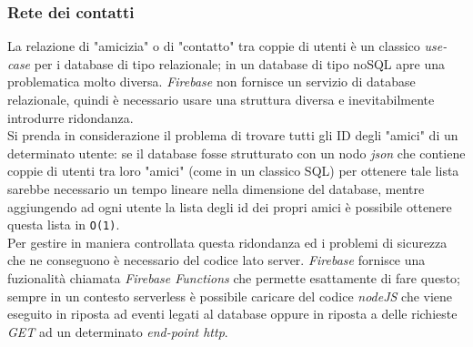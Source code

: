 \documentclass[conference]{IEEEtran}
\begin{document}
		\subsubsection{Rete dei contatti}
			La relazione di "amicizia" o di "contatto" tra coppie di utenti è un classico \textit{use-case} per i database di tipo
			relazionale; in un database di tipo noSQL apre una problematica molto diversa. \textit{Firebase} non fornisce
			un servizio di database relazionale, quindi è necessario usare una struttura diversa e inevitabilmente introdurre
			ridondanza.\\
			Si prenda in considerazione il problema di trovare tutti gli ID degli "amici" di un determinato utente:
			se il database fosse strutturato con un nodo \textit{json} che contiene coppie di utenti tra loro "amici" (come in un classico SQL)
			per ottenere tale lista sarebbe necessario un tempo lineare nella dimensione del database, mentre aggiungendo ad ogni utente
			la lista degli id dei propri amici è possibile ottenere questa lista in \texttt{O(1)}.\\
			Per gestire in maniera controllata questa ridondanza ed i problemi di sicurezza che ne conseguono è necessario del codice
			lato server. \textit{Firebase} fornisce una fuzionalità chiamata \textit{Firebase Functions} che permette esattamente
			di fare questo; sempre in un contesto serverless è possibile caricare del codice \textit{nodeJS} che viene eseguito
			in riposta ad eventi legati al database oppure in riposta a delle richieste \textit{GET} ad un determinato 
			\textit{end-point http}.
\end{document}
